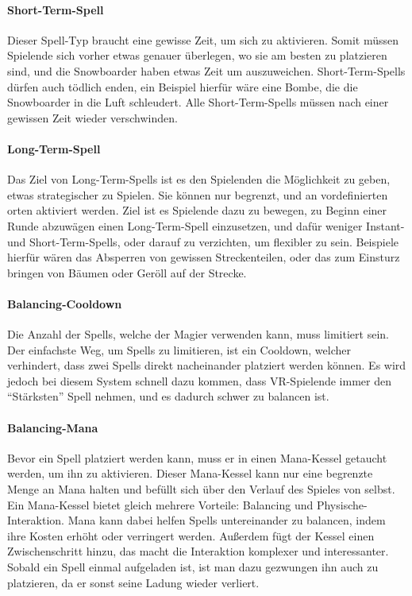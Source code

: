 \paragraph{Short-Term-Spell}
Dieser Spell-Typ braucht eine gewisse Zeit, um sich zu aktivieren. Somit müssen Spielende sich vorher etwas genauer überlegen, wo sie am besten zu platzieren sind, und die Snowboarder haben etwas Zeit um auszuweichen. Short-Term-Spells dürfen auch tödlich enden, ein Beispiel hierfür wäre eine Bombe, die die Snowboarder in die Luft schleudert. Alle Short-Term-Spells müssen nach einer gewissen Zeit wieder verschwinden.

\paragraph{Long-Term-Spell}
Das Ziel von Long-Term-Spells ist es den Spielenden die Möglichkeit zu geben, etwas strategischer zu Spielen. Sie können nur begrenzt, und an vordefinierten orten aktiviert werden. Ziel ist es Spielende dazu zu bewegen, zu Beginn einer Runde abzuwägen einen Long-Term-Spell einzusetzen, und dafür weniger Instant- und Short-Term-Spells, oder darauf zu verzichten, um flexibler zu sein. Beispiele hierfür wären das Absperren von gewissen Streckenteilen, oder das zum Einsturz bringen von Bäumen oder Geröll auf der Strecke.

\paragraph{Balancing-Cooldown}
Die Anzahl der Spells, welche der Magier verwenden kann, muss limitiert sein. Der einfachste Weg, um Spells zu limitieren, ist ein Cooldown, welcher verhindert, dass zwei Spells direkt nacheinander platziert werden können. Es wird jedoch bei diesem System schnell dazu kommen, dass VR-Spielende immer den "`Stärksten"' Spell nehmen, und es dadurch schwer zu balancen ist.

\paragraph{Balancing-Mana\label{_mana}}
Bevor ein Spell platziert werden kann, muss er in einen Mana-Kessel getaucht werden, um ihn zu aktivieren. Dieser Mana-Kessel kann nur eine begrenzte Menge an Mana halten und befüllt sich über den Verlauf des Spieles von selbst. Ein Mana-Kessel bietet gleich mehrere Vorteile: Balancing und Physische-Interaktion. Mana kann dabei helfen Spells untereinander zu balancen, indem ihre Kosten erhöht oder verringert werden. Außerdem fügt der Kessel einen Zwischenschritt hinzu, das macht die Interaktion komplexer und interessanter. Sobald ein Spell einmal aufgeladen ist, ist man dazu gezwungen ihn auch zu platzieren, da er sonst seine Ladung wieder verliert.

